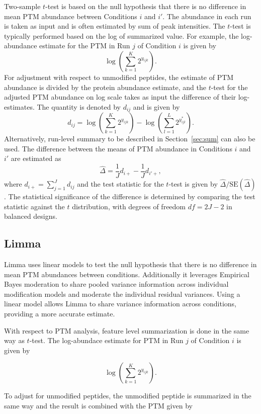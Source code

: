 \documentclass{mcp}
\def\secref#1{Section~\ref{#1}}
\begin{document}
Two-sample $t$-test is based on the null hypothesis that there is no difference in mean PTM abundance between Conditions $i$ and $i'$. The abundance in each run is taken as input and is often estimated by sum of peak intensities. The $t$-test is typically performed based on the log of summarized value. For example, the log-abundance estimate for the PTM in Run $j$ of Condition $i$ is given by
\[
\log \left( \sum_{k=1}^{K} 2^{y_{ijk}} \right).
\]
For adjustment with respect to unmodified peptides, the estimate of PTM abundance is divided by the protein abundance estimate, 
and the $t$-test for the adjusted PTM abundance on log scale takes as input the difference of their log-estimates.
The quantity is denoted by $d_{ij}$ and is given by
\[
d_{ij} = \log \left( \sum_{k=1}^{K} 2^{y_{ijk}} \right) - \log \left( \sum_{l=1}^{L} 2^{y_{ijl}^{\ast}} \right).
\]
Alternatively, run-level summary to be described in \secref{sec:sum} can also be used. The difference between the means of PTM abundance in Conditions $i$ and $i'$ are estimated as
\[
\hat{\Delta} = \frac{1}{J} d_{i+} - \frac{1}{J} d_{i'+},
\]
where $d_{i+} = \sum_{j=1}^{J} d_{ij}$ and the test statistic for the $t$-test is given by $\hat{\Delta} / \mathrm{SE}(\hat{\Delta})$. The statistical significance of the difference is determined by comparing the test statistic against the $t$ distribution, with degrees of freedom $df=2J-2$ in balanced designs.

\subsection{Limma}

Limma uses linear models to test the null hypothesis that there is no difference in mean PTM abundances between conditions. Additionally it leverages Empirical Bayes moderation to share pooled variance information across individual modification models and moderate the individual residual variances. Using a linear model allows Limma to share variance information across conditions, providing a more accurate estimate.

With respect to PTM analysis, feature level summarization is done in the same way as $t$-test. The log-abundace estimate for PTM in Run $j$ of Condition $i$ is given by 

\[
\log \left( \sum_{k=1}^{K} 2^{y_{ijk}} \right).
\]

To adjust for unmodified peptides, the unmodified peptide is summarized in the same way and the result is combined with the PTM given by
\end{document}
